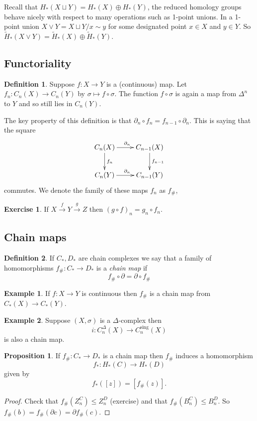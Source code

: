 \documentclass[12pt]{article}
\theoremstyle{definition}
\newtheorem*{prop}{Proposition}
\theoremstyle{definition}
\newtheorem*{defn}{Definition}
\newtheorem*{ex}{Example}
\newtheorem*{exer}{Exercise}
\newcommand{\C}{C_*}
\renewcommand{\H}{H_*}
\begin{document}
Recall that $\H (X\sqcup Y) = \H(X) \oplus \H(Y)$, the reduced homology groups behave nicely with respect to many operations such as 1-point unions.
In a 1-point union $X\vee Y = X\sqcup Y /x\sim y$ for some designated point $x\in X$ and $y\in Y$.
So $\tilde \H(X\vee Y) = \tilde \H(X) \oplus \tilde \H(Y)$.

\subsection{Functoriality}
\begin{defn}
Suppose $f\colon X \to Y$ is a (continuous) map.
Let $f_n\colon C_n(X) \to C_n(Y)$ by $\sigma \mapsto f\circ \sigma$.
The function $f\circ \sigma$ is again a map from $\Delta^n$ to $Y$ and so still lies in $C_n(Y)$.

The key property of this definition is that $\partial_n\circ f_n = f_{n-1}\circ \partial_n$.
This is saying that the square
\[
\xymatrix{
C_n(X)\ar[d]^{f_{n}} \ar[r]^{\partial_n} & C_{n-1}(X) \ar[d]^{f_{n-1}}\\
C_n(Y) \ar[r]^{\partial_n} & C_{n-1}(Y)\\
}
\]
commutes.
We denote the family of these maps $f_n$ as $f_\#$,
\end{defn}

\begin{exer}
If $X \xrightarrow{f} Y \xrightarrow{g} Z$ then $(g\circ f)_n = g_n \circ f_n$.
\end{exer}

\subsection{Chain maps}
\begin{defn}
If $\C, D_*$ are chain complexes we say that a family of homomorphisms $f_\#\colon \C \to D_*$ is  a \emph{chain map} if 
\[
f_\#\circ \partial = \partial \circ f_\#
\]
\end{defn}

\begin{ex}
If $f\colon X \to Y$ is continuous then $f_\#$ is a chain map from $\C (X) \to \C(Y)$.
\end{ex}
\begin{ex}
Suppose $(X,\sigma)$ is a $\Delta$-complex then 
\[
i\colon C_n^\Delta(X) \to C_n^\text{sing}(X)
\]
is also a chain map.
\end{ex}

\begin{prop}
If $f_\#\colon \C \to D_*$ is a chain map then $f_\#$ induces a homomorphism
\[
f_*\colon \H(C) \to \H(D)
\]
given by
\[
f_*([z]) = [f_\#(z)].
\]
\end{prop}
\begin{proof}
Check that $f_\#(Z_n^C) \le Z_n^D$ (exercise) and that $f_\#(B_n^C) \le B_n^D$.
So $f_\#(b) = f_\#(\partial c )  = \partial f_\#(c)$.
\end{proof}
\end{document}
